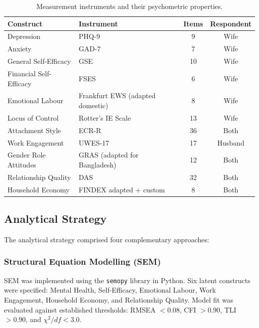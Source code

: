 \documentclass[12pt, a4paper]{article}
\begin{document}
\begin{table}[H]
\centering
\caption{Measurement instruments and their psychometric properties.}
\label{tab:instruments}
\small
\begin{tabularx}{\textwidth}{lXcc}
\toprule
\textbf{Construct} & \textbf{Instrument} & \textbf{Items} & \textbf{Respondent} \\
\midrule
Depression          & PHQ-9 \citep{kroenke2001}              & 9  & Wife \\
Anxiety             & GAD-7 \citep{spitzer2006}              & 7  & Wife \\
General Self-Efficacy & GSE \citep{schwarzer1995}             & 10 & Wife \\
Financial Self-Efficacy & FSES \citep{lown2011}              & 6  & Wife \\
Emotional Labour    & Frankfurt EWS (adapted domestic)        & 8  & Wife \\
Locus of Control    & Rotter's IE Scale                       & 13 & Wife \\
Attachment Style    & ECR-R \citep{fraley2000}                & 36 & Both \\
Work Engagement     & UWES-17 \citep{schaufeli2002}           & 17 & Husband \\
Gender Role Attitudes & GRAS (adapted for Bangladesh)         & 12 & Both \\
Relationship Quality & DAS \citep{spanier1976}                & 32 & Both \\
Household Economy   & FINDEX adapted + custom                 & 8  & Both \\
\bottomrule
\end{tabularx}
\end{table}

\subsection{Analytical Strategy}

The analytical strategy comprised four complementary approaches:

\subsubsection{Structural Equation Modelling (SEM)}
SEM was implemented using the \texttt{semopy} library in Python. Six latent constructs were specified: Mental Health, Self-Efficacy, Emotional Labour, Work Engagement, Household Economy, and Relationship Quality. Model fit was evaluated against established thresholds: RMSEA $< 0.08$, CFI $> 0.90$, TLI $> 0.90$, and $\chi^2/df < 3.0$.
\end{document}
